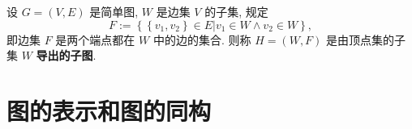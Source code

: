 \documentclass[10pt,UTF8]{book} %
\begin{document}
\begin{definition}
    设 $G = (V, E)$ 是简单图, $W$ 是边集 $V$ 的子集, 规定
    \[ F := \left\{ \left\{v_1, v_2\right\} \in E |
    v_1 \in W \wedge v_2 \in W \right\}, \]
    即边集 $F$ 是两个端点都在 $W$ 中的边的集合. 则称 $H = (W, F)$ 是由顶点集的子集 $W$
    \textbf{导出的子图}.
\end{definition}


\newpage
\section{图的表示和图的同构}

\end{document}
